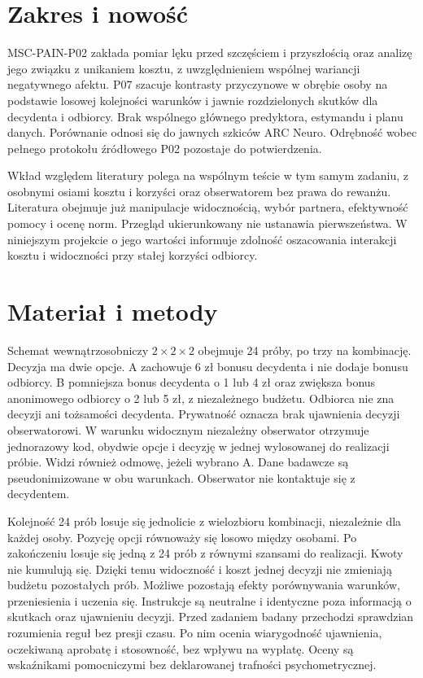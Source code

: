 \documentclass[11pt,a4paper]{article}
\begin{document}
\section{Zakres i nowość}
MSC-PAIN-P02 zakłada pomiar lęku przed szczęściem i przyszłością oraz analizę jego związku z unikaniem kosztu, z uwzględnieniem wspólnej wariancji negatywnego afektu. P07 szacuje kontrasty przyczynowe w obrębie osoby na podstawie losowej kolejności warunków i jawnie rozdzielonych skutków dla decydenta i odbiorcy. Brak wspólnego głównego predyktora, estymandu i planu danych. Porównanie odnosi się do jawnych szkiców ARC Neuro. Odrębność wobec pełnego protokołu źródłowego P02 pozostaje do potwierdzenia.

Wkład względem literatury polega na wspólnym teście w tym samym zadaniu, z osobnymi osiami kosztu i korzyści oraz obserwatorem bez prawa do rewanżu. Literatura obejmuje już manipulacje widocznością, wybór partnera, efektywność pomocy i ocenę norm. Przegląd ukierunkowany nie ustanawia pierwszeństwa. W niniejszym projekcie o jego wartości informuje zdolność oszacowania interakcji kosztu i widoczności przy stałej korzyści odbiorcy.

\section{Materiał i metody}
Schemat wewnątrzosobniczy $2\times2\times2$ obejmuje 24 próby, po trzy na kombinację. Decyzja ma dwie opcje. A zachowuje 6 zł bonusu decydenta i nie dodaje bonusu odbiorcy. B pomniejsza bonus decydenta o 1 lub 4 zł oraz zwiększa bonus anonimowego odbiorcy o 2 lub 5 zł, z niezależnego budżetu. Odbiorca nie zna decyzji ani tożsamości decydenta. Prywatność oznacza brak ujawnienia decyzji obserwatorowi. W warunku widocznym niezależny obserwator otrzymuje jednorazowy kod, obydwie opcje i decyzję w jednej wylosowanej do realizacji próbie. Widzi również odmowę, jeżeli wybrano A. Dane badawcze są pseudonimizowane w obu warunkach. Obserwator nie kontaktuje się z decydentem.

Kolejność 24 prób losuje się jednolicie z wielozbioru kombinacji, niezależnie dla każdej osoby. Pozycję opcji równoważy się losowo między osobami. Po zakończeniu losuje się jedną z 24 prób z równymi szansami do realizacji. Kwoty nie kumulują się. Dzięki temu widoczność i koszt jednej decyzji nie zmieniają budżetu pozostałych prób. Możliwe pozostają efekty porównywania warunków, przeniesienia i uczenia się. Instrukcje są neutralne i identyczne poza informacją o skutkach oraz ujawnieniu decyzji. Przed zadaniem badany przechodzi sprawdzian rozumienia reguł bez presji czasu. Po nim ocenia wiarygodność ujawnienia, oczekiwaną aprobatę i stosowność, bez wpływu na wypłatę. Oceny są wskaźnikami pomocniczymi bez deklarowanej trafności psychometrycznej.
\end{document}
